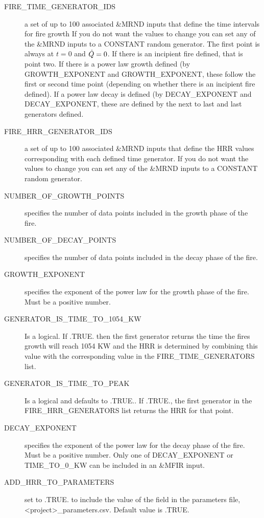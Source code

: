 \documentclass[12pt,twoside]{book}
\begin{document}
\begin{description}
  \item[FIRE\_TIME\_GENERATOR\_IDS] a set of up to 100 associated {\ct \&MRND} inputs that define the time intervals for fire growth If you do not want the values to change you can set any of the {\ct \&MRND} inputs to a {\ct CONSTANT} random generator. The first point is always at $t=0$ and $\dot{Q} = 0$. If there is an incipient fire defined, that is point two. If there is a power law growth defined (by {\ct GROWTH\_EXPONENT} and {\ct GROWTH\_EXPONENT}, these follow the first or second time point (depending on whether there is an incipient fire defined). If a power law decay is defined (by {\ct DECAY\_EXPONENT} and {\ct DECAY\_EXPONENT}, these are defined by the next to last and last generators defined.
  \item[FIRE\_HRR\_GENERATOR\_IDS] a set of up to 100 associated {\ct \&MRND} inputs that define the HRR values corresponding with each defined time generator. If you do not want the values to change you can set any of the {\ct \&MRND} inputs to a {\ct CONSTANT} random generator.
  \item[NUMBER\_OF\_GROWTH\_POINTS] specifies the number of data points included in the growth phase of the fire.
  \item[NUMBER\_OF\_DECAY\_POINTS] specifies the number of data points included in the decay phase of the fire.
  \item[GROWTH\_EXPONENT] specifies the exponent of the power law for the growth phase of the fire. Must be a positive number.
  \item[GENERATOR\_IS\_TIME\_TO\_1054\_KW] Is a logical. If {\ct .TRUE.} then the first generator returns the time the fires growth will reach 1054 KW and the HRR is determined by combining this value with the corresponding value in the {\ct FIRE\_TIME\_GENERATORS} list.
  \item[GENERATOR\_IS\_TIME\_TO\_PEAK] Is a logical and defaults to {\ct .TRUE.}. If {\ct .TRUE.}, the first generator in the {\ct FIRE\_HRR\_GENERATORS} list returns the HRR for that point.
  \item[DECAY\_EXPONENT] specifies the exponent of the power law for the decay phase of the fire. Must be a positive number. Only one of {\ct DECAY\_EXPONENT} or {\ct TIME\_TO\_0\_KW} can be included in an {\ct \&MFIR} input.
  \item[ADD\_HRR\_TO\_PARAMETERS] set to .TRUE. to include the value of the field in the parameters file, {\ct <project>\_parameters.csv}. Default value is .TRUE.

\end{description}
\end{document}
